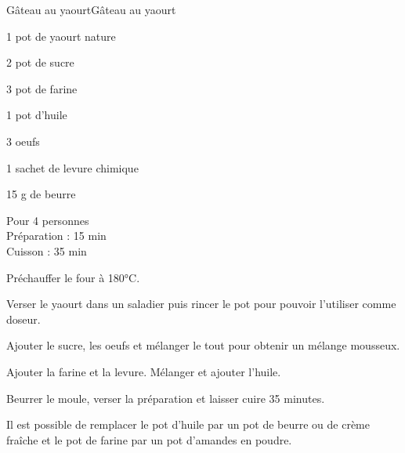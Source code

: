 \begin{recette}{Gâteau au yaourt}{Gâteau au yaourt}

\begin{ingredients}
1 pot de yaourt nature\par
2 pot de sucre\par
3 pot de farine\par
1 pot d'huile\par
3 oeufs\par
1 sachet de levure chimique\par
15 g de beurre\par
\end{ingredients}

\begin{infos}
Pour 4 personnes\\
Préparation : 15 min\\
Cuisson : 35 min\\
\end{infos}

\begin{etapes}
\item Préchauffer le four à 180°C.
\item Verser le yaourt dans un saladier puis rincer le pot pour pouvoir l'utiliser comme doseur.
\item Ajouter le sucre, les oeufs et mélanger le tout pour obtenir un mélange mousseux.
\item Ajouter la farine et la levure. Mélanger et ajouter l'huile.
\item Beurrer le moule, verser la préparation et laisser cuire 35 minutes.
\end{etapes}

\begin{conseils}
Il est possible de remplacer le pot d'huile par un pot de beurre ou de crème fraîche et le pot de farine par un pot d'amandes en poudre.
\end{conseils}

\end{recette}